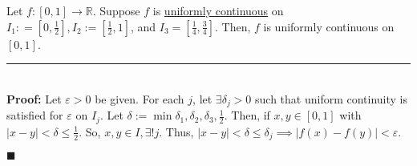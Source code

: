 \documentclass[11pt]{book}
\newcommand{\R}{\mathbb{R}}
\newcommand{\horline}{\noindent\rule{14.25cm}{0.6pt}\\}
\newcommand{\QED}{\begin{flushright}$\blacksquare$\end{flushright}}
\begin{document}
	\label{subsec:lemm545}
		\begin{lemm}
			Let $f:[0,1] \to \R$. Suppose $f$ is \hyperref[subsec:uniformcontinuity]{uniformly continuous} on $I_1 : = [0,\frac{1}{2}], I_2 := [\frac{1}{2},1]$,
			and $I_3 = [\frac{1}{4},\frac{3}{4}]$. Then, $f$ is uniformly continuous on $[0,1]$.\hfill\break
			\horline
			\textbf{Proof:} Let $\varepsilon > 0$ be given. For each $j$, let $\exists \delta_j > 0$ such that uniform continuity is satisfied for $\varepsilon$ on $I_j$.
			Let $\delta := \min{\delta_1,\delta_2,\delta_3,\frac{1}{2}}$. Then, if $x,y \in [0,1]$ with $|x - y| < \delta \leq \frac{1}{2}$. So, $x,y \in I, 
			\exists!j$. Thus, $|x - y| < \delta \leq \delta_j \implies |f(x) - f(y)| < \varepsilon$. \QED

		\end{lemm}
\end{document}
